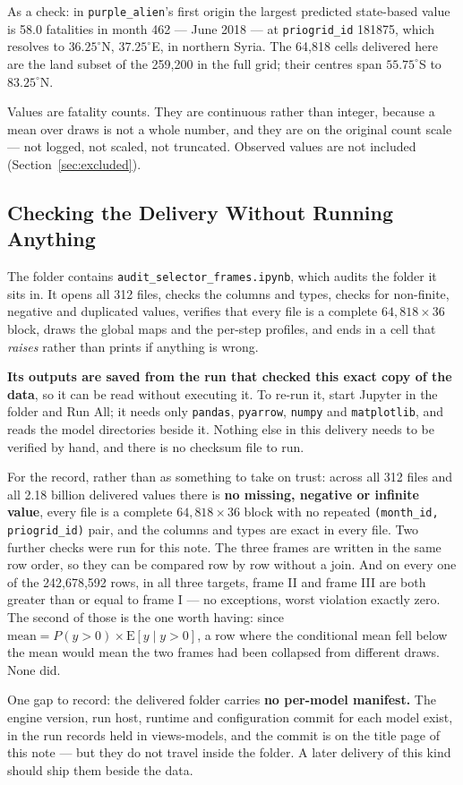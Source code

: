 \noindent As a check: in \texttt{purple\_alien}'s first origin the largest predicted state-based
value is 58.0 fatalities in month 462 --- June 2018 --- at \texttt{priogrid\_id} 181875, which
resolves to $36.25^\circ$N, $37.25^\circ$E, in northern Syria. The 64,818 cells delivered here are
the land subset of the 259,200 in the full grid; their centres span $55.75^\circ$S to
$83.25^\circ$N.

Values are fatality counts. They are continuous rather than integer, because a mean over draws is
not a whole number, and they are on the original count scale --- not logged, not scaled, not
truncated. Observed values are not included (Section~\ref{sec:excluded}).

\subsection*{Checking the Delivery Without Running Anything}

The folder contains \texttt{audit\_selector\_frames.ipynb}, which audits the folder it sits in. It
opens all 312 files, checks the columns and types, checks for non-finite, negative and duplicated
values, verifies that every file is a complete $64{,}818 \times 36$ block, draws the global maps
and the per-step profiles, and ends in a cell that \emph{raises} rather than prints if anything is
wrong.

\textbf{Its outputs are saved from the run that checked this exact copy of the data}, so it can be
read without executing it. To re-run it, start Jupyter in the folder and Run All; it needs only
\texttt{pandas}, \texttt{pyarrow}, \texttt{numpy} and \texttt{matplotlib}, and reads the model
directories beside it. Nothing else in this delivery needs to be verified by hand, and there is no
checksum file to run.

For the record, rather than as something to take on trust: across all 312 files and all 2.18 billion
delivered values there is \textbf{no missing, negative or infinite value}, every file is a complete
$64{,}818 \times 36$ block with no repeated \texttt{(month\_id, priogrid\_id)} pair, and the
columns and types are exact in every file. Two further checks were run for this note. The three
frames are written in the same row order, so they can be compared row by row without a join. And on
every one of the 242,678,592 rows, in all three targets, frame II and frame III are both greater
than or equal to frame I --- no exceptions, worst violation exactly zero. The second of those is
the one worth having: since $\text{mean} = P(y>0) \times \mathrm{E}[y \mid y>0]$, a row where the
conditional mean fell below the mean would mean the two frames had been collapsed from different
draws. None did.

One gap to record: the delivered folder carries \textbf{no per-model manifest.} The engine version,
run host, runtime and configuration commit for each model exist, in the run records held in
views-models, and the commit is on the title page of this note --- but they do not travel inside
the folder. A later delivery of this kind should ship them beside the data.
